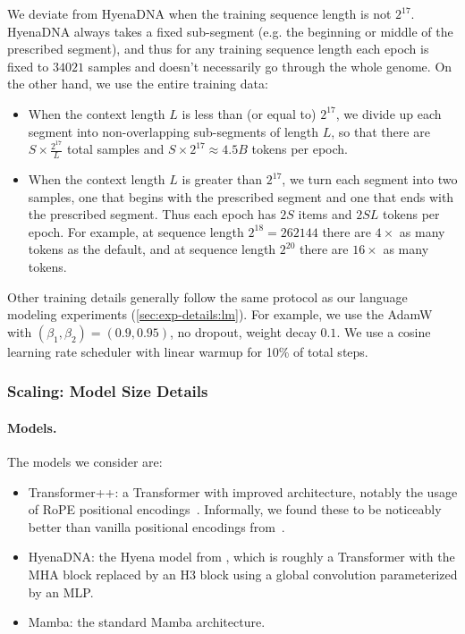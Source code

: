We deviate from HyenaDNA when the training sequence length is not $2^{17}$.
HyenaDNA always takes a fixed sub-segment (e.g. the beginning or middle of the prescribed segment), and thus for any training sequence length each epoch is fixed to $34021$ samples and doesn't necessarily go through the whole genome.
On the other hand, we use the entire training data:
\begin{itemize}[leftmargin=*,topsep=0pt]
  \item When the context length $L$ is less than (or equal to) $2^{17}$, we divide up each segment into non-overlapping sub-segments of length $L$, so that there are $S \times \frac{2^{17}}{L}$ total samples and $S \times 2^{17} \approx 4.5B$ tokens per epoch.
  \item When the context length $L$ is greater than $2^{17}$, we turn each segment into two samples, one that begins with the prescribed segment and one that ends with the prescribed segment. Thus each epoch has $2S$ items and $2SL$ tokens per epoch. For example, at sequence length $2^{18}=262144$ there are $4\times$ as many tokens as the default, and at sequence length $2^{20}$ there are $16\times$ as many tokens.
\end{itemize}


Other training details generally follow the same protocol as our language modeling experiments (\cref{sec:exp-details:lm}).
For example, we use the AdamW with $(\beta_1, \beta_2) = (0.9, 0.95)$, no dropout, weight decay $0.1$.
We use a cosine learning rate scheduler with linear warmup for 10\% of total steps.

\subsubsection{Scaling: Model Size Details}

\paragraph{Models.}
The models we consider are:
\begin{itemize}[leftmargin=*,itemsep=0pt]
  \item Transformer++: a Transformer with improved architecture, notably the usage of RoPE positional encodings~\citep{su2021roformer}. Informally, we found these to be noticeably better than vanilla positional encodings from~\citep{vaswani2017attention}.
  \item HyenaDNA: the Hyena model from \citet{poli2023hyena,nguyen2023hyenadna}, which is roughly a Transformer with the MHA block replaced by an H3 block using a global convolution parameterized by an MLP.
  \item Mamba: the standard Mamba architecture.
\end{itemize}

